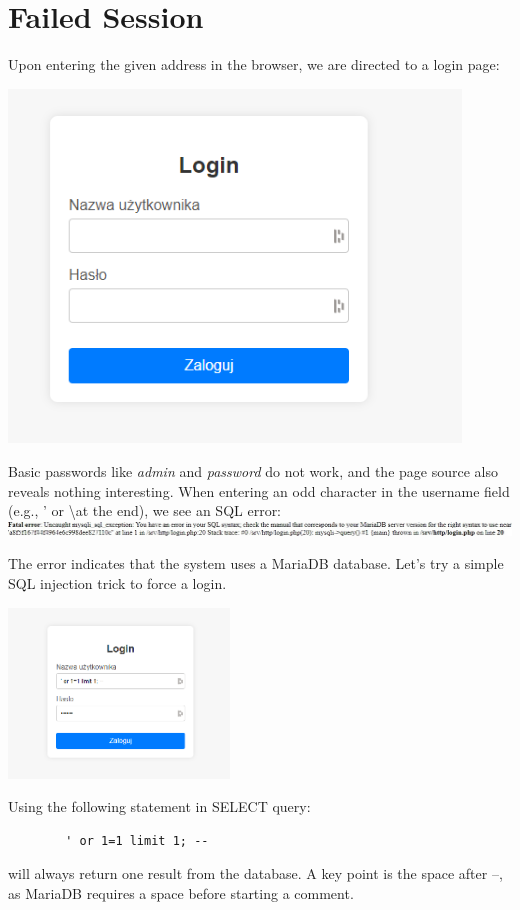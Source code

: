 \documentclass{article}
\begin{document}
\section{Failed Session}
Upon entering the given address in the browser, we are directed to a login page:
\begin{center}
    \includegraphics[width=0.9\textwidth]{"image20.png"}
\end{center}
\vspace{3mm}

Basic passwords like \textit{admin} and \textit{password} do not work, and the page source also reveals nothing interesting. When entering an odd character in the username field (e.g., ' or \textbackslash at the end), we see an SQL error:
\vspace{3mm} \\
\includegraphics[width=\textwidth]{"image21.jpeg"}
\vspace{3mm}

The error indicates that the system uses a MariaDB database. Let’s try a simple SQL injection trick to force a login.
\begin{multicols}{2}
    \begin{center}
        \includegraphics[width=0.44\textwidth]{"image19.png"}
    \end{center}
    \columnbreak
    Using the following statement in SELECT query:
    \begin{verbatim}
        ' or 1=1 limit 1; --
    \end{verbatim}
    will always return one result from the database. A key point is the space after --, as MariaDB requires a space before starting a comment.
\end{multicols}
\end{document}
